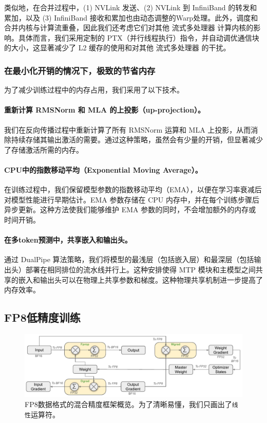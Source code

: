 \documentclass[lang=cn,a4paper,newtx]{elegantpaper}
\begin{document}
类似地，在合并过程中，(1) NVLink 发送、(2) NVLink 到 InfiniBand 的转发和累加，以及 (3) InfiniBand 接收和累加也由动态调整的Warp处理。此外，调度和合并内核与计算流重叠，因此我们还考虑它们对其他 流式多处理器 计算内核的影响。具体而言，我们采用定制的 PTX（并行线程执行）指令，并自动调优通信块的大小，这显著减少了 L2 缓存的使用和对其他 流式多处理器 的干扰。

\subsubsection{在最小化开销的情况下，极致的节省内存}

为了减少训练过程中的内存占用，我们采用了以下技术。

\paragraph{重新计算 RMSNorm 和 MLA 的上投影（up-projection）。}
我们在反向传播过程中重新计算了所有 RMSNorm 运算和 MLA 上投影，从而消除持续存储其输出激活的需要。通过这种策略，虽然会有少量的开销，但显著减少了存储激活所需的内存。

\paragraph{CPU中的指数移动平均（Exponential Moving Average）。}
在训练过程中，我们保留模型参数的指数移动平均（EMA），以便在学习率衰减后对模型性能进行早期估计。EMA 参数存储在 CPU 内存中，并在每个训练步骤后异步更新。这种方法使我们能够维护 EMA 参数的同时，不会增加额外的内存或时间开销。

\paragraph{在多token预测中，共享嵌入和输出头。}
通过 DualPipe 算法策略，我们将模型的最浅层（包括嵌入层）和最深层（包括输出头）部署在相同排位的流水线并行上。这种安排使得 MTP 模块和主模型之间共享的嵌入和输出头可以在物理上共享参数和梯度。这种物理共享机制进一步提高了内存效率。

\subsection{FP8低精度训练}

\begin{figure}[!t]
\centering
\includegraphics[width=0.99\linewidth]{figures/fp8-frameworkv3-repaired.pdf}
\caption{FP8数据格式的混合精度框架概览。为了清晰易懂，我们只画出了\texttt{线性}运算符。}
\label{fig:fp8_framework}
\end{figure}
\end{document}
